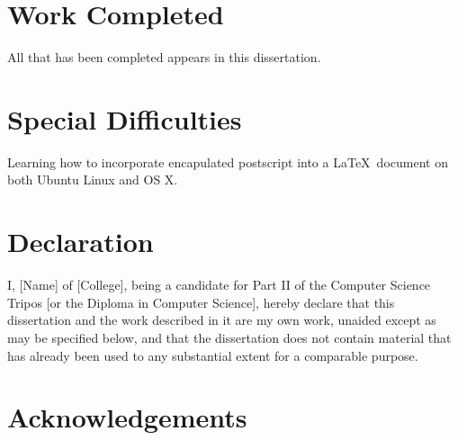 \documentclass[12pt,a4paper,twoside,openany]{report}
\begin{document}
\section*{Work Completed}

All that has been completed appears in this dissertation.

\section*{Special Difficulties}

Learning how to incorporate encapulated postscript into a \LaTeX\
document on both Ubuntu Linux and OS X.
 
\newpage
\section*{Declaration}

I, [Name] of [College], being a candidate for Part II of the Computer
Science Tripos [or the Diploma in Computer Science], hereby declare
that this dissertation and the work described in it are my own work,
unaided except as may be specified below, and that the dissertation
does not contain material that has already been used to any substantial
extent for a comparable purpose.

\bigskip
{}

\medskip
{}

\tableofcontents

\listoffigures

\newpage
\section*{Acknowledgements}


\pagestyle{headings}











\printbibliography


\end{document}

